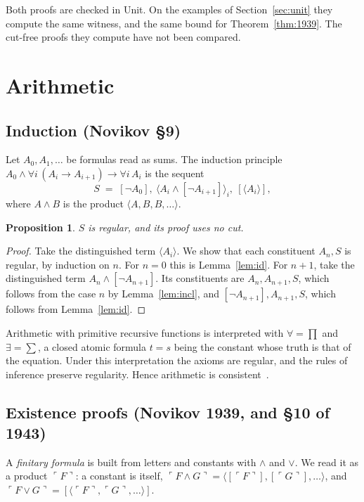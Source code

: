 \documentclass[11pt]{amsart}
\newtheorem{proposition}[theorem]{Proposition}
\theoremstyle{definition}
\theoremstyle{remark}
\newcommand{\seq}[1]{\langle #1\rangle}
\newcommand{\one}[1]{[#1]}
\begin{document}
Both proofs are checked in Unit. On the examples of
Section~\ref{sec:unit} they compute the same witness, and the same
bound for Theorem~\ref{thm:1939}. The cut-free proofs
they compute have not been compared.

\section{Arithmetic}

\subsection*{Induction (Novikov \S9)}
Let $A_0,A_1,\dots$ be formulas read as sums. The induction principle
$A_0\wedge\forall i\,(A_i\to A_{i+1})\to\forall i\,A_i$ is the sequent
\[
  S \;=\; \one{\neg A_0},\ \seq{A_i\wedge\one{\neg A_{i+1}}}_i,\ \one{\seq{A_i}},
\]
where $A\wedge B$ is the product $\seq{A,B,B,\dots}$.

\begin{proposition}
  $S$ is regular, and its proof uses no cut.
\end{proposition}

\begin{proof}
  Take the distinguished term $\seq{A_i}$. We show that each constituent
  $A_n,S$ is regular, by induction on $n$. For $n=0$ this is
  Lemma~\ref{lem:id}. For $n+1$, take the distinguished term
  $A_n\wedge\one{\neg A_{n+1}}$. Its constituents are
  $A_n,A_{n+1},S$, which follows from the case $n$ by Lemma~\ref{lem:incl},
  and $\one{\neg A_{n+1}},A_{n+1},S$, which follows from
  Lemma~\ref{lem:id}.
\end{proof}

Arithmetic with primitive recursive functions is interpreted with
$\forall=\prod$ and $\exists=\sum$, a closed atomic formula $t=s$ being
the constant whose truth is that of the equation. Under this
interpretation the axioms are regular, and the rules of inference
preserve regularity. Hence arithmetic is consistent~\cite[\S9]{Novikov}.

\subsection*{Existence proofs (Novikov 1939, and \S10 of 1943)}

A \emph{finitary formula} is built from letters and constants with
$\wedge$ and $\vee$. We read it
as a product $\ulcorner F\urcorner$: a constant is itself,
$\ulcorner F\wedge G\urcorner=\seq{\one{\ulcorner F\urcorner},
\one{\ulcorner G\urcorner},\dots}$, and
$\ulcorner F\vee G\urcorner=\one{\seq{\ulcorner F\urcorner,\ulcorner
G\urcorner,\dots}}$.
\end{document}
